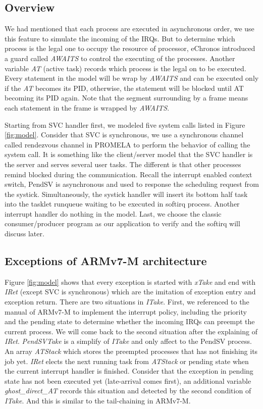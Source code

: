 \subsection{Overview}
We had mentioned that each process are executed in asynchronous order, we use this feature to simulate the incoming of the IRQs. But to determine which process is the legal one to occupy the resource of processor, eChronos introduced a guard called \textit{AWAITS} to control the executing of the processes. Another variable \textit{AT} (active task) records which process is the legal on to be executed. Every statement in the model will be wrap by \textit{AWAITS} and can be executed only if the \textit{AT} becomes its PID, otherwise, the statement will be blocked until AT becoming its PID again. Note that the segment surrounding by a frame means each statement in the frame is wrapped by \textit{AWAITS}.

Starting from SVC handler first, we modeled five system calls listed in Figure \ref{fig:model}. Consider that SVC is synchronous, we use a synchronous channel called rendezvous channel in PROMELA to perform the behavior of calling the system call. It is something like the client/server model that the SVC handler is the server and serves several user tasks. The different is that other processes remind blocked during the communication. Recall the interrupt enabled context switch, PendSV is asynchronous and used to response the scheduling request from the systick. Simultaneously, the systick handler will insert its bottom half task into the tasklet runqueue waiting to be executed in softirq process. Another interrupt handler do nothing in the model. Last, we choose the classic consumer/producer program as our application to verify and the softirq will discuss later.

\subsection{Exceptions of ARMv7-M architecture}
Figure \ref{fig:model} shows that every exception is started with \textit{xTake} and end with \textit{IRet} (except SVC is synchronous) which are the imitation of exception entry and exception return. There are two situations in \textit{ITake}. First, we referenced to the manual of ARMv7-M to implement the interrupt policy, including the priority and the pending state to determine whether the incoming IRQs can preempt the current process. We will come back to the second situation after the explaining of \textit{IRet}. \textit{PendSVTake} is a simplify of \textit{ITake} and only affect to the PendSV process. An array \textit{ATStack} which stores the preempted processes that has not finishing its job yet. \textit{IRet} elects the next running task from \textit{ATStack} or pending state when the current interrupt handler is finished. Consider that the exception in pending state has not been executed yet (late-arrival comes first), an additional variable \textit{ghost\_direct\_AT} records this situation and detected by the second condition of \textit{ITake}. And this is similar to the tail-chaining in ARMv7-M.


